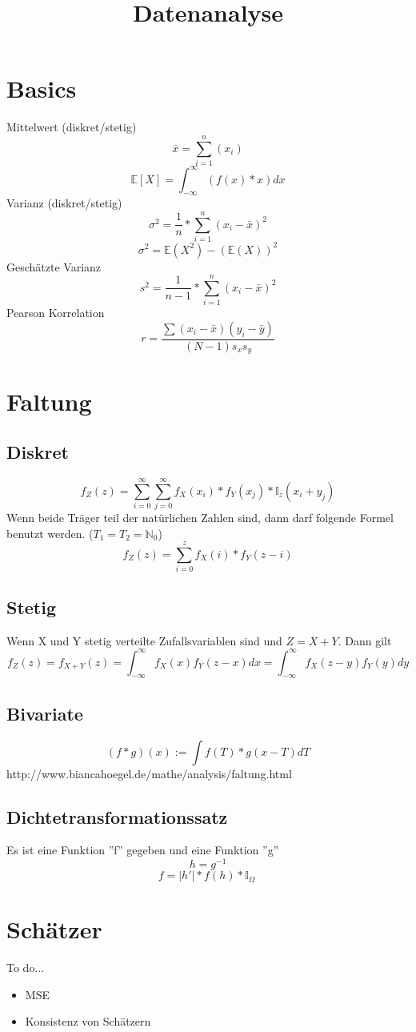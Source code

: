 \documentclass{article}
\title{Datenanalyse}
\begin{document}
	\maketitle
	\section{Basics}
	Mittelwert (diskret/stetig)
	\[\bar{x} = \sum_{i=1}^{n}(x_i) \]	
	\[\mathbb{E}[X]=\int_{-\infty}^{\infty} (f(x)*x) dx\]
	Varianz (diskret/stetig)
	\[{\sigma}^{2} = \frac{1}{n}*\sum_{i=1}^{n}(x_i - \bar{x})^2\]
	\[{\sigma}^{2} = \mathbb{E}(X^2)-(\mathbb{E}(X))^2\]
	Geschätzte Varianz
	\[{s}^{2} = \frac{1}{n-1}*\sum_{i=1}^{n}(x_i - \bar{x})^2\]
	Pearson Korrelation
	\[r=\frac{\sum(x_i-\bar{x})(y_i-\bar{y})}{(N-1)s_x s_y}\]
	\section{Faltung}
	\subsection{Diskret}
	\[f_Z(z)=\sum_{i=0}^{\infty}\sum_{j=0}^{\infty}f_X(x_i)*f_Y(x_j)*\mathbb{I}_{z}(x_i+y_j)\]
	Wenn beide Träger teil der natürlichen Zahlen sind, dann darf folgende Formel benutzt werden. ($T_1=T_2=\mathbb{N}_0$)
	\[f_Z(z)=\sum_{i=0}^{z}f_X(i)*f_Y(z-i)\]
	\subsection{Stetig}
	Wenn X und Y stetig verteilte Zufallsvariablen sind und $Z=X+Y$. Dann gilt
	\[f_Z(z)=f_{X+Y}(z)=\int_{-\infty}^{\infty}f_X(x)f_Y(z-x)dx=\int_{-\infty}^{\infty}f_X(z-y)f_Y(y)dy\]
	\subsection{Bivariate}	
	\[(f*g)(x):= \int f(T) * g(x - T) dT\]
	http://www.biancahoegel.de/mathe/analysis/faltung.html
	\subsection{Dichtetransformationssatz}
	Es ist eine Funktion ''f'' gegeben und eine Funktion ''g''
	\[h = {g}^{-1}\]
	\[f = |h'| * f(h) * \mathbb{I}_\Omega \ \]
	\section{Schätzer}
	To do...
	\begin{itemize}
		\item MSE
		\item Konsistenz von Schätzern
	\end{itemize}
\end{document}
